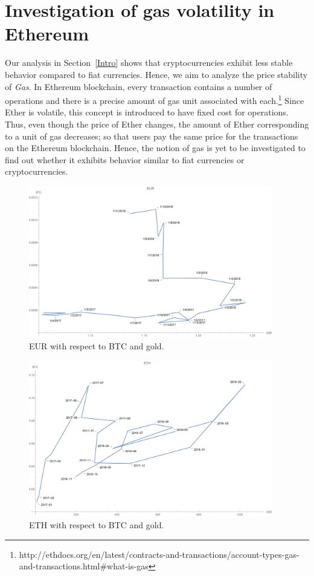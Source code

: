 \section{Investigation of gas volatility in Ethereum}
Our analysis in Section~\ref{Intro} shows that cryptocurrencies exhibit less stable behavior compared to fiat currencies. Hence, we aim to analyze the price stability of \emph{Gas}. In Ethereum blockchain, every transaction contains a number of operations and there is a precise amount of gas unit associated with each.\footnote{http://ethdocs.org/en/latest/contracts-and-transactions/account-types-gas-and-transactions.html\#what-is-gas} Since Ether is volatile, this concept is introduced to have fixed cost for operations. Thus, even though the price of Ether changes, the amount of Ether corresponding to a unit of gas decreases; so that users pay the same price for the transactions on the Ethereum blockchain. Hence, the notion of gas is yet to be investigated to find out whether it exhibits behavior similar to fiat currencies or cryptocurrencies.

\begin{figure}[!htb]
	\centering
	\includegraphics[width=0.95\textwidth]{figures/eur.pdf}
	\caption{\label{fig:eur} EUR with respect to BTC and gold.}
\end{figure}

\begin{figure}[!htb]
	\centering
	\includegraphics[width=0.95\textwidth]{figures/eth.pdf}
	\caption{\label{fig:eth} ETH with respect to BTC and gold.}
\end{figure}


